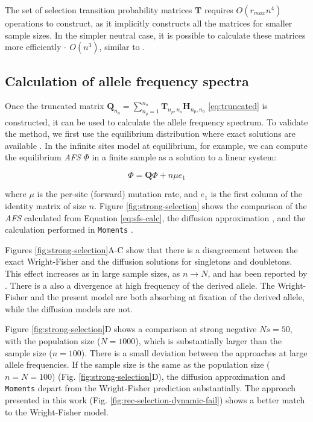 \documentclass[review]{elsarticle}
\newcommand{\ra}{\rightarrow}
\begin{document}
The set of selection transition probability matrices $\mathbf{T}$ requires $O(r_{max}n^4)$
operations to construct, as it implicitly constructs all the matrices for smaller sample sizes. In
the simpler neutral case, it is possible to calculate these matrices more efficiently - $O(n^3)$,
similar to \cite{BhaskarEtAl2014}.

\subsection{Calculation of allele frequency spectra}
\label{subsec:afs}

Once the truncated matrix
$\mathbf{Q}_{n_o} = \sum_{n_p=1}^{n_{o}} \mathbf{T}_{n_p,n_o} \mathbf{H}_{n_p,n_o}$
\eqref{eq:truncated} is constructed, it can be used to calculate the allele frequency spectrum. To
validate the method, we first use the equilibrium distribution where exact solutions are available
\citep{Krukov2016}. In the infinite sites model at equilibrium, for example, we can compute the
equilibrium \textit{AFS} $\Phi$ in a finite sample as a solution to a linear system:

\begin{equation}
  \label{eq:sfs-calc}
  \Phi = \mathbf{Q}\Phi  + n \mu e_1
\end{equation}

where $\mu$ is the per-site (forward) mutation rate, and $e_1$ is the first column of the identity
matrix of size $n$. Figure \ref{fig:strong-selection} shows the comparison of the \textit{AFS}
calculated from Equation \eqref{eq:sfs-calc}, the diffusion approximation
\cite[eq. 9.23]{Ewens2004}, and the calculation performed in \texttt{Moments}
\citep{JouganousEtAl2017}.

Figures \ref{fig:strong-selection}A-C show that there is a disagreement between the exact
Wright-Fisher and the diffusion solutions for singletons and doubletons. This effect increases as in
large sample sizes, as $n \ra N$, and has been reported by \citep{BhaskarEtAl2014}. There is a also
a divergence at high frequency of the derived allele. The Wright-Fisher and the present model are
both absorbing at fixation of the derived allele, while the diffusion models are not. 

Figure \ref{fig:strong-selection}D shows a comparison at strong negative $Ns=50$, with the
population size ($N=1000$), which is substantially larger than the sample size ($n=100$). There is a
small deviation between the approaches at large allele frequencies. If the sample size is the same
as the population size ($n=N=100$) (Fig. \ref{fig:strong-selection}D), the diffusion approximation
and \texttt{Moments} depart from the Wright-Fisher prediction substantially. The approach presented
in this work (Fig. \ref{fig:rec-selection-dynamic-fail}) shows a better match to the Wright-Fisher
model.
\end{document}
